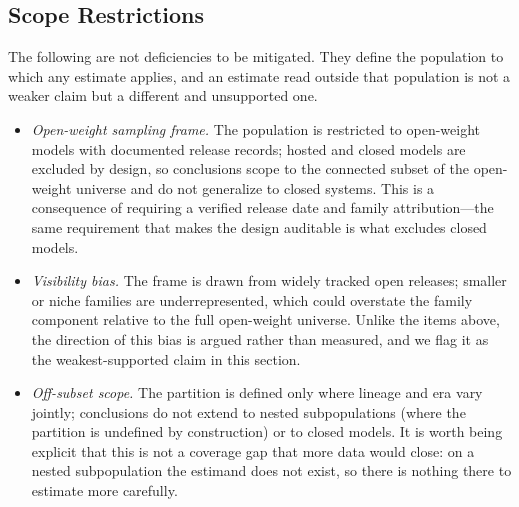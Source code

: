 \documentclass{ieeeaccess}
\theoremstyle{definition}
\theoremstyle{plain}
\begin{document}
\subsection{Scope Restrictions}
The following are not deficiencies to be mitigated. They define the population
to which any estimate applies, and an estimate read outside that population is
not a weaker claim but a different and unsupported one.
\begin{itemize}
\item \emph{Open-weight sampling frame.} The population is restricted to open-weight
  models with documented release records; hosted and closed models are excluded by
  design, so conclusions scope to the connected subset of the open-weight universe
  and do not generalize to closed systems. This is a consequence of requiring a
  verified release date and family attribution---the same requirement that makes
  the design auditable is what excludes closed models.
\item \emph{Visibility bias.} The frame is drawn from widely tracked open releases;
  smaller or niche families are underrepresented, which could overstate the family
  component relative to the full open-weight universe. Unlike the items above,
  the direction of this bias is argued rather than measured, and we flag it as
  the weakest-supported claim in this section.
\item \emph{Off-subset scope.} The partition is defined only where lineage and era
  vary jointly; conclusions do not extend to nested subpopulations (where the
  partition is undefined by construction) or to closed models. It is worth being
  explicit that this is not a coverage gap that more data would close: on a
  nested subpopulation the estimand does not exist, so there is nothing there to
  estimate more carefully.
\end{itemize}
\end{document}
